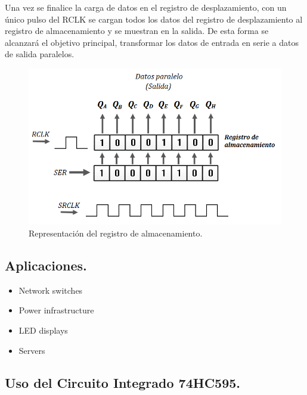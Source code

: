 \documentclass{article}
\begin{document}
Una vez se finalice la carga de datos en el registro de desplazamiento, con un único pulso del RCLK se cargan todos los datos del registro de desplazamiento al registro de almacenamiento y se muestran en la salida. De esta forma se alcanzará el objetivo principal, transformar los datos de entrada en serie a datos de salida paralelos.

\begin{figure}[h]
\includegraphics[scale=0.8]{salida.png}
\centering
\caption{Representación del registro de almacenamiento.}
\label{fig:salida}
\end{figure}


\subsection{Aplicaciones.}\label{Aplicaciones}
\begin{itemize}
\item Network switches
\item Power infrastructure
\item LED displays
\item Servers
\end{itemize}

\subsection{Uso del Circuito Integrado 74HC595.}\label{Usocircuito}
\end{document}
